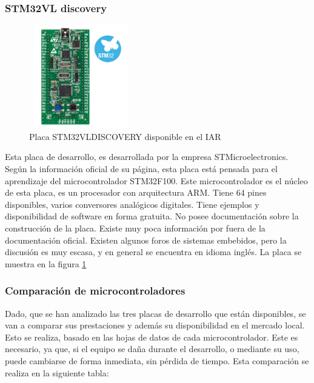 \subsubsection{STM32VL discovery}

\begin{figure}
	\includegraphics[width=0.4\textwidth,height=45mm] {stm32vl}
	\caption{Placa STM32VLDISCOVERY disponible en el IAR}
	\label{fig:stm32}
\end{figure}

Esta placa de desarrollo, es desarrollada por la empresa STMicroelectronics. Según la información oficial de su página, esta placa está pensada para el aprendizaje del microcontrolador STM32F100. Este microcontrolador es el núcleo de esta placa, es un procesador con arquitectura ARM. Tiene 64 pines disponibles, varios conversores analógicos digitales. Tiene ejemplos y disponibilidad de software en forma gratuita. No posee documentación sobre la construcción de la placa. Existe muy poca información por fuera de la documentación oficial. Existen algunos foros de sistemas embebidos, pero la discusión es muy escasa, y en general se encuentra en idioma inglés. La placa se muestra en la figura \ref{fig:stm32}




\subsubsection{Comparación de microcontroladores} 
Dado, que se han analizado las tres placas de desarrollo que están disponibles, se van a comparar sus prestaciones y además su disponibilidad en el mercado local. Esto se realiza, basado en las hojas de datos de cada microcontrolador. Este es necesario, ya que, si el equipo se daña durante el desarrollo, o mediante su uso, puede cambiarse de forma inmediata, sin pérdida de tiempo. Esta comparación se realiza en la siguiente tabla:  

